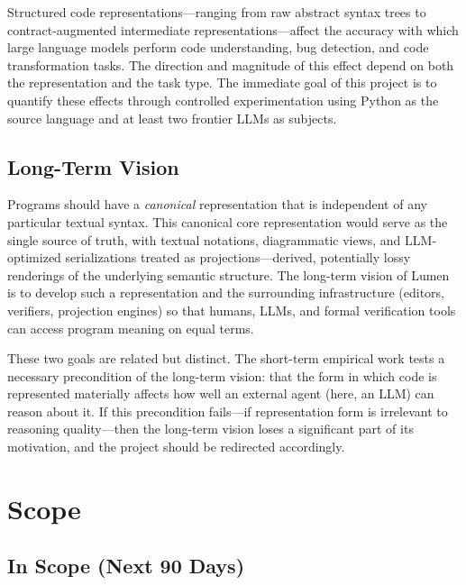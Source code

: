 \documentclass[11pt]{article}
\begin{document}
Structured code representations---ranging from raw abstract syntax trees
to contract-augmented intermediate representations---affect the accuracy
with which large language models perform code understanding, bug
detection, and code transformation tasks.  The direction and magnitude
of this effect depend on both the representation and the task type.
The immediate goal of this project is to quantify these effects through
controlled experimentation using Python as the source language and at
least two frontier LLMs as subjects.

\subsection*{Long-Term Vision}

Programs should have a \emph{canonical} representation that is
independent of any particular textual syntax.  This canonical core
representation would serve as the single source of truth, with textual
notations, diagrammatic views, and LLM-optimized serializations treated
as projections---derived, potentially lossy renderings of the underlying
semantic structure.  The long-term vision of Lumen is to develop such a
representation and the surrounding infrastructure (editors, verifiers,
projection engines) so that humans, LLMs, and formal verification tools
can access program meaning on equal terms.

These two goals are related but distinct.  The short-term empirical work
tests a necessary precondition of the long-term vision: that the form in
which code is represented materially affects how well an external agent
(here, an LLM) can reason about it.  If this precondition fails---if
representation form is irrelevant to reasoning quality---then the
long-term vision loses a significant part of its motivation, and the
project should be redirected accordingly.


\section{Scope}
\label{sec:scope}

\subsection*{In Scope (Next 90 Days)}
\end{document}
